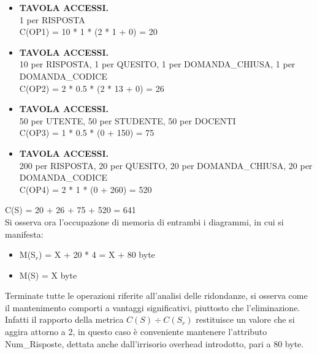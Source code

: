 \documentclass{article}
\begin{document}
\begin{itemize}[label={ }]
    \itemsep0em 
    \item {\small\textbf{TAVOLA ACCESSI.} \\ 1 per RISPOSTA} \vspace*{2pt}\\ C(OP1) = 10 * 1 * (2 * 1 + 0) = 20 \vspace*{2pt} 
    \item {\small\textbf{TAVOLA ACCESSI.} \\ 10 per RISPOSTA, 1 per QUESITO, 1 per DOMANDA\_CHIUSA, 1 per DOMANDA\_CODICE} \vspace*{2pt}\\ C(OP2) = 2 * 0.5 * (2 * 13 + 0) = 26 \vspace*{2pt}
    \item {\small\textbf{TAVOLA ACCESSI.} \\ 50 per UTENTE, 50 per STUDENTE, 50 per DOCENTI} \vspace*{2pt}\\ C(OP3) = 1 * 0.5 * (0 + 150) = 75
    \item {\small\textbf{TAVOLA ACCESSI.} \\ 200 per RISPOSTA, 20 per QUESITO, 20 per DOMANDA\_CHIUSA, 20 per DOMANDA\_CODICE} \vspace*{2pt}\\ C(OP4) = 2 * 1 * (0 + 260) = 520
\end{itemize}
\hspace*{15pt}C(S) = 20 + 26 + 75 + 520 = 641 \vspace*{7pt} \vspace*{7pt}\\
Si osserva ora l'occupazione di memoria di entrambi i diagrammi, in cui si manifesta:
\begin{itemize}[label={-}]
    \itemsep0em
    \item M(S$_r$) = X + 20 * 4 = X + 80 byte
    \item M(S) = \hspace*{1pt}X byte
\end{itemize}
Terminate tutte le operazioni riferite all'analisi delle ridondanze, si osserva come il mantenimento comporti a vantaggi significativi, piuttosto che l'eliminazione. Infatti il rapporto della metrica $C(S) \div C(S_r)$ restituisce un valore che si aggira attorno a 2, in questo caso è conveniente mantenere l'attributo Num\_Risposte, dettata anche dall'irrisorio overhead introdotto, pari a 80 byte.
\end{document}
